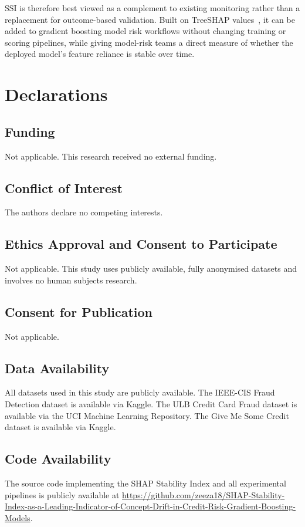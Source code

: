 \documentclass[pdflatex,sn-mathphys-num]{sn-jnl}
\theoremstyle{thmstyleone}
\theoremstyle{thmstyletwo}
\theoremstyle{thmstylethree}
\begin{document}
SSI is therefore best viewed as a complement to existing monitoring rather than
a replacement for outcome-based validation. Built on TreeSHAP
values~\cite{lundberg2020trees}, it can be added to gradient boosting model
risk workflows without changing training or scoring pipelines, while giving
model-risk teams a direct measure of whether the deployed model's feature
reliance is stable over time.


\backmatter

\section*{Declarations}

\subsection*{Funding}
Not applicable. This research received no external funding.

\subsection*{Conflict of Interest}
The authors declare no competing interests.

\subsection*{Ethics Approval and Consent to Participate}
Not applicable. This study uses publicly available, fully anonymised datasets
and involves no human subjects research.

\subsection*{Consent for Publication}
Not applicable.

\subsection*{Data Availability}
All datasets used in this study are publicly available. The IEEE-CIS Fraud Detection dataset is available via Kaggle. The ULB
Credit Card Fraud dataset is available via the UCI Machine Learning Repository.
The Give Me Some Credit dataset is available via Kaggle.

\subsection*{Code Availability}
The source code implementing the SHAP Stability Index and all experimental
pipelines is publicly available at \url{https://github.com/zeeza18/SHAP-Stability-Index-as-a-Leading-Indicator-of-Concept-Drift-in-Credit-Risk-Gradient-Boosting-Models}.
\end{document}
